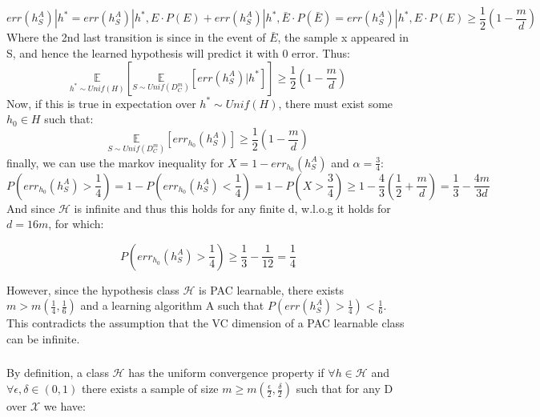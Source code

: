 \begin{equation*}
    \mathit{err}(h_S^A) | h^*  = \mathit{err}(h_S^A) | h^*, E \cdot P(E) + \mathit{err}(h_S^A) | h^*, \bar{E} \cdot P(\bar{E}) = \mathit{err}(h_S^A) | h^*, E \cdot P(E) \geq \frac{1}{2} (1-\frac{m}{d})
\end{equation*}
Where the 2nd last transition is since in the event of $\bar{E}$, the sample x appeared in S, and hence the learned hypothesis will predict it with 0 error. Thus:
\begin{equation*}
    \underset{h^* \sim Unif(H)}{\mathbb{E}} \left[\underset{S \sim Unif(D_C^m)}{\mathbb{E}}  \left[ \mathit{err}(h_S^A) | h^* \right] \right] \geq \frac{1}{2} (1-\frac{m}{d})
\end{equation*}
Now, if this is true in expectation over $h^* \sim Unif(H)$, there must exist some $h_0 \in H$ such that:
\begin{equation*}    
    \underset{S \sim Unif(D_C^m)}{\mathbb{E}}  \left[ err_{h_0}(h_S^A) \right] \geq \frac{1}{2} (1-\frac{m}{d})
\end{equation*}
finally, we can use the markov inequality for $X = 1 - err_{h_0}(h_S^A)$ and $\alpha = \frac{3}{4}$:
\begin{equation*}
    P(err_{h_0}(h_S^A) > \frac{1}{4}) = 1 - P(err_{h_0}(h_S^A) < \frac{1}{4}) = 1 - P(X > \frac{3}{4}) \geq 1 - \frac{4}{3}(\frac{1}{2} + \frac{m}{d}) = \frac{1}{3} - \frac{4m}{3d}
\end{equation*}
And since $\mathcal{H}$ is infinite and thus this holds for any finite d, w.l.o.g it holds for $d=16m$, for which:

\begin{equation*}
    P(err_{h_0}(h_S^A) > \frac{1}{4}) \geq \frac{1}{3} - \frac{1}{12} = \frac{1}{4}
\end{equation*}

However, since the hypothesis class $\mathcal{H}$ is PAC learnable, there exists $m > m(\frac{1}{4}, \frac{1}{6})$ and a learning algorithm A such that $P(\mathit{err}(h_S^A) > \frac{1}{4}) < \frac{1}{6}$.
This contradicts the assumption that the VC dimension of a PAC learnable class can be infinite.


\subsubsection{}
By definition, a class $\mathcal{H}$ has the uniform convergence property if $\forall h \in \mathcal{H}$ and $\forall \epsilon, \delta \in (0, 1)$ there exists a sample of size $m \geq m(\frac{\epsilon}{2}, \frac{\delta}{2})$ such that for any D over $\mathcal{X}$ we have:

